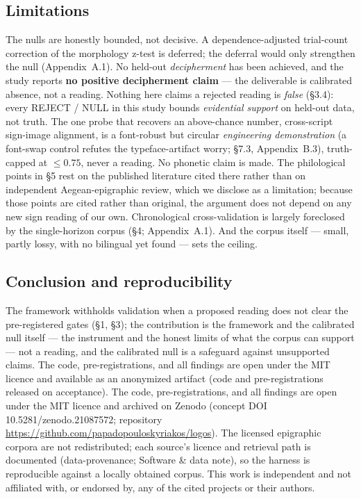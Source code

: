 \subsection{Limitations}

The nulls are honestly bounded, not decisive. A dependence-adjusted
trial-count correction of the morphology z-test is deferred; the deferral
would only strengthen the null (Appendix~A.1). No held-out
\emph{decipherment} has
been achieved, and the study reports \textbf{no positive decipherment
claim} --- the deliverable is calibrated absence, not a reading. Nothing
here claims a rejected reading is \emph{false} (\S3.4): every REJECT /
NULL in this study bounds \emph{evidential support}
on held-out data, not truth. The one probe that recovers an above-chance
number, cross-script sign-image alignment, is a font-robust but circular
\emph{engineering demonstration} (a font-swap control refutes the
typeface-artifact worry; \S7.3, Appendix~B.3), truth-capped at
$\le 0.75$, never a reading. No
phonetic claim is made. The philological points in \S5 rest on the
published literature cited there rather than on independent
Aegean-epigraphic
review, which we disclose as a limitation; because those points are cited
rather than original, the argument does not depend on any new sign reading
of our own. Chronological cross-validation is largely foreclosed by the
single-horizon corpus (\S4; Appendix~A.1). And the corpus itself
--- small, partly lossy, with no bilingual yet found
\citep[\S8]{salgarella2025} --- sets the ceiling.

\subsection{Conclusion and reproducibility}

The framework withholds validation when a proposed reading does not clear
the pre-registered gates (\S1, \S3); the contribution is the
framework and the calibrated null itself --- the instrument and the honest
limits of what the corpus can support --- not a reading, and the calibrated
null is a safeguard against unsupported claims.
\ifanon
The code, pre-registrations, and all findings are open under the MIT
licence and available as an anonymized artifact (code and pre-registrations
released on acceptance).
\else
The code, pre-registrations, and all findings are open under the MIT
licence and archived on Zenodo (concept DOI 10.5281/zenodo.21087572;
repository \url{https://github.com/papadopouloskyriakos/logos}).
\fi
The licensed epigraphic corpora are not redistributed; each source's
licence and retrieval path is documented (data-provenance; Software \&
data note), so the harness is reproducible against a
locally obtained corpus. This work is independent and not affiliated with,
or endorsed by, any of the cited projects or their authors.

